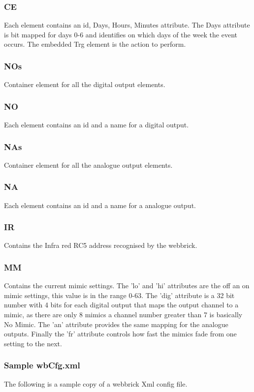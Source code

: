\subsubsection {CE}
Each element contains an id, Days, Hours, Minutes attribute. The Days attribute is bit mapped for days 0-6
and identifies on which days of the week the event occurs. The embedded Trg element is the action to perform.

\subsubsection {NOs}
Container element for all the digital output elements.

\subsubsection {NO}
Each element contains an id and a name for a digital output.

\subsubsection {NAs}
Container element for all the analogue output elements.

\subsubsection {NA}
Each element contains an id and a name for a analogue output.

\subsubsection {IR}
Contains the Infra red RC5 address recognised by the webbrick.

\subsubsection {MM}
Contains the current mimic settings. The 'lo' and 'hi' attributes are the off an on mimic settings, this value
is in the range 0-63. The 'dig' attribute is a 32 bit number with 4 bits for each digital output that maps the 
output channel to a mimic, as there are only 8 mimics a channel number greater than 7 is basically No Mimic. 
The 'an' attribute provides the same mapping for the analogue outputs. Finally the 'fr' attribute controls
how fast the mimics fade from one setting to the next.

\subsubsection {Sample wbCfg.xml}
The following is a sample copy of a webbrick Xml config file.


